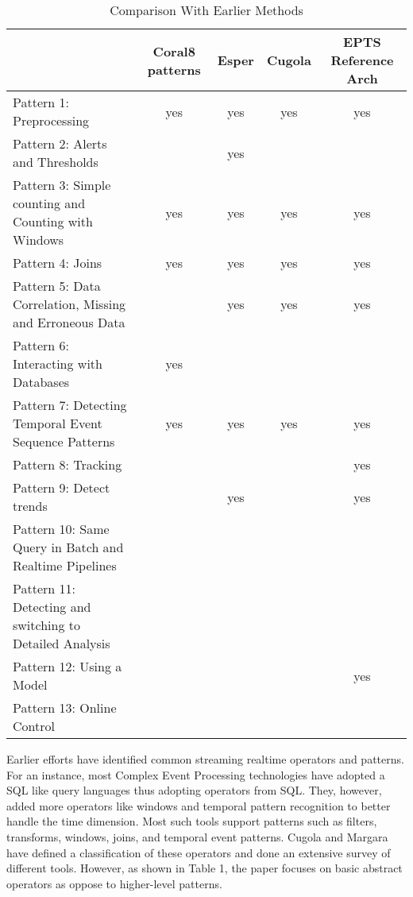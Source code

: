 \documentclass{sig-alternate}
\begin{document}
{\renewcommand{\arraystretch}{1.8}
\begin{table*}[htbp]
\begin{center}
\caption{Comparison With Earlier Methods}
\label{table:datasets}
\begin{tabular}{| l | c | c | c | c |}
\hline
& Coral8 patterns & Esper	& Cugola	& EPTS Reference Arch \\ \hline
Pattern 1: Preprocessing &	yes &	yes &	yes &	yes \\ \hline
Pattern 2: Alerts and Thresholds & & yes &  & \\ \hline		
Pattern 3: Simple counting and Counting with Windows & 	yes &	yes &	yes &	yes \\ \hline
Pattern 4: Joins &	yes &	yes &	yes	& yes \\ \hline
Pattern 5: Data Correlation, Missing and Erroneous Data & & yes	& yes	& yes \\ \hline
Pattern 6: Interacting with Databases & yes & & &		\\ \hline
Pattern 7: Detecting Temporal Event Sequence Patterns &	yes & yes & yes	& yes \\ \hline
Pattern 8: Tracking & & & &	yes \\ \hline
Pattern 9: Detect trends &  & yes	& &	yes \\ \hline
Pattern 10: Same Query in Batch and Realtime Pipelines & & & &\\ \hline
Pattern 11: Detecting and switching to Detailed Analysis & & & & \\ \hline
Pattern 12: Using a Model & & & &		yes \\ \hline
Pattern 13: Online Control & & & & \\ \hline
\end{tabular}
\end{center}
\end{table*}

Earlier efforts have identified common streaming realtime operators and patterns. For an instance, most Complex Event Processing technologies have adopted a SQL like query languages thus adopting operators from SQL. They, however, added more operators like windows and temporal pattern recognition to better handle the time dimension. Most such tools support patterns such as filters, transforms, windows, joins, and temporal event patterns. Cugola and Margara~\cite{cugolaprocessing} have defined a classification of these operators and done an extensive survey of different tools. However, as shown in Table 1, the paper focuses on basic abstract operators as oppose to higher-level patterns. 

}
\end{document}
